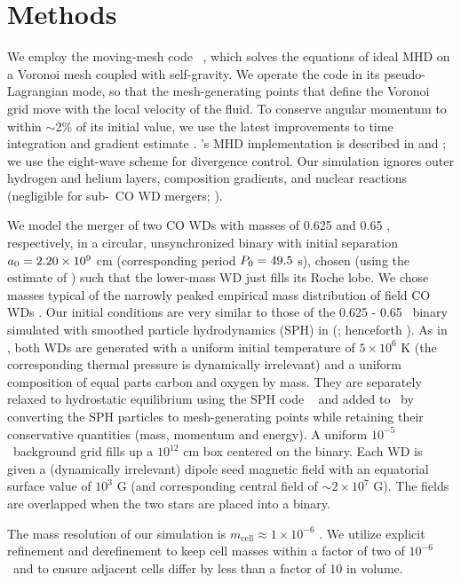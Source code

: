 \section{Methods} 
\label{sec:c4_codes}

We employ the moving-mesh code \arepo\ \citep{spri10}, which solves the equations of ideal MHD on a Voronoi mesh coupled with self-gravity.  We operate the code in its pseudo-Lagrangian mode, so that the mesh-generating points that define the Voronoi grid move with the local velocity of the fluid.  To conserve angular momentum to within $\sim2$\% of its initial value, we use the latest improvements to time integration and gradient estimate \citep{pakm+16}.  \arepo's MHD implementation is described in \cite{pakmbv11} and \cite{pakmv13}; we use the \cite{powe+99} eight-wave scheme for divergence control.  Our simulation ignores outer hydrogen and helium layers, composition gradients, and nuclear reactions (negligible for sub-\Mch\ CO WD mergers; \citealt{loreig09,rask+12}).

We model the merger of two CO WDs with masses of 0.625 and 0.65 \Msun, respectively, in a circular, unsynchronized binary with initial separation $\azero = 2.20\times10^9$ cm (corresponding period $\pzero = 49.5$ s), chosen (using the estimate of \citealt{eggl83}) such that the lower-mass WD just fills its Roche lobe.  We chose masses typical of the narrowly peaked empirical mass distribution of field CO WDs \citep{klei+13}.  Our initial conditions are very similar to those of the 0.625 - 0.65 \Msun\ binary simulated with smoothed particle hydrodynamics (SPH) in \citeauthor{zhu+13} (\citeyear{zhu+13}; henceforth \citeal{zhu+13}).  As in \citeal{zhu+13}, both WDs are generated with a uniform initial temperature of $5\times10^6$ K (the corresponding thermal pressure is dynamically irrelevant) and a uniform composition of equal parts carbon and oxygen by mass.  They are separately relaxed to hydrostatic equilibrium using the SPH code \gasoline\ \citep{wadssq04} and added to \arepo\ by converting the SPH particles to mesh-generating points while retaining their conservative quantities (mass, momentum and energy).  A uniform $10^{-5}$ \gcc\ background grid fills up a $10^{12}$ cm box centered on the binary. Each WD is given a (dynamically irrelevant) dipole seed magnetic field with an equatorial surface value of $10^3$ G (and corresponding central field of $\sim2\times10^7$ G). The fields are overlapped when the two stars are placed into a binary.

The mass resolution of our simulation is $m_\mathrm{cell} \approx 1\times10^{-6}$ \Msun.  We utilize explicit refinement and derefinement \citep{voge+12} to keep cell masses within a factor of two of $10^{-6}$ \Msun\ and to ensure adjacent cells differ by less than a factor of 10 in volume.

